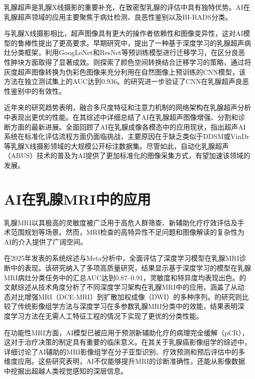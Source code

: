 \documentclass[12pt,a4paper]{article}
\begin{document}
乳腺超声是乳腺X线摄影的重要补充，在致密型乳腺的评估中具有独特优势。AI在乳腺超声领域的应用主要聚焦于病灶检测、良恶性鉴别以及BI-RADS分类。

与乳腺X线摄影相比，超声图像具有更大的操作者依赖性和图像变异性，这对AI模型的鲁棒性提出了更高要求。早期研究中，\citet{han2022breast}提出了一种基于深度学习的乳腺超声病灶分类框架，利用GoogLeNet和ResNet等预训练模型进行迁移学习，在区分良恶性肿块方面取得了显著成效。\citet{byra2020breast}则探索了颜色空间转换结合迁移学习的策略，通过将灰度超声图像转换为伪彩色图像来充分利用在自然图像上预训练的CNN模型，该方法在独立测试集上的AUC达到0.936。\citet{fujioka2020distinction}的研究进一步验证了CNN在乳腺超声良恶性鉴别中的有效性。

近年来的研究趋势表明，融合多尺度特征和注意力机制的网络架构在乳腺超声分析中表现出更优的性能。\citet{zhang2023recent}在其综述中详细总结了AI在乳腺超声图像增强、分割和诊断方面的最新进展。\citet{alkarawi2024review}全面回顾了AI在乳腺成像各模态中的应用现状，指出超声AI系统在标准化评估流程方面仍面临挑战，主要原因在于缺乏类似于DDSM或VinDr等乳腺X线摄影领域的大规模公开标注数据集。尽管如此，自动化乳腺超声（ABUS）技术的普及为AI提供了更加标准化的图像采集方式，有望加速该领域的发展。

\section{AI在乳腺MRI中的应用}

乳腺MRI以其极高的灵敏度被广泛用于高危人群筛查、新辅助化疗疗效评估及手术范围规划等场景。然而，MRI检查的高特异性不足问题和图像解读的复杂性为AI的介入提供了广阔空间。

\citet{abdullah2025deep}在2025年发表的系统综述与Meta分析中，全面评估了深度学习模型在乳腺MRI诊断中的表现。该研究纳入了多项高质量研究，结果显示基于深度学习的模型在乳腺MRI病灶分类任务中的汇总AUC达到0.87--0.91，灵敏度和特异度均表现出色。\citet{adam2023deep}的文献综述从技术角度分析了不同深度学习架构在乳腺MRI中的应用，涵盖了从动态对比增强MRI（DCE-MRI）到扩散加权成像（DWI）的多种序列。\citet{truhn2019radiomic}的研究则比较了传统影像组学方法与深度学习在多参数乳腺MRI分类中的效能，结果表明深度学习方法在无需人工特征工程的情况下实现了更优的分类性能。

在功能性MRI方面，AI模型已被应用于预测新辅助化疗的病理完全缓解（pCR），这对于治疗决策的制定具有重要的临床意义。\citet{qi2024radiomics}在其关于乳腺癌影像组学的综述中，详细讨论了AI辅助的MRI影像组学在分子亚型识别、疗效预测和预后评估中的多维度应用。这些研究表明，AI不仅能够提升MRI的诊断准确性，还能从影像数据中挖掘出超越人类视觉感知的深层信息。
\end{document}
